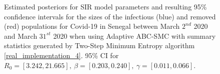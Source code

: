 \documentclass[11pt,a4paper]{article}
\theoremstyle{break}
\begin{document}
  \begin{figure}[H]
    \centering
    \caption{Estimated posteriors for SIR model parameters and resulting 95\% confidence intervals for the sizes of the infectious (blue) and removed (red) populations for Covid-19 in Senegal between March $2^{nd}$ 2020 and March $31^{st}$ 2020 when using Adaptive ABC-SMC with summary statistics generated by Two-Step Minimum Entropy algorithm \ref{real_implementation_4}. 95\% CI for $R_0=[3.242,21.665],\ \beta=[0.203,0.240],\ \gamma=[0.011,0.066]$.}
    \label{fig_senegal_2_me}
  \end{figure}
\end{document}
